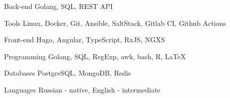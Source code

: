

\begin{cvskills}

  \cvskill
    {Back-end} %
    {Golang, SQL, REST API} %

  \cvskill
    {Tools} %
    {Linux, Docker, Git, Ansible, SaltStack, Gitlab CI, Github Actions} %

  \cvskill
    {Front-end} %
    {Hugo, Angular, TypeScript, RxJS, NGXS} %

  \cvskill
    {Programming} %
    {Golang, SQL, RegExp, awk, bash, R, LaTeX} %

  \cvskill
    {Databases} %
    {PostgreSQL, MongoDB, Redis} %


  \cvskill
    {Languages} %
    {Russian - native, English - intermediate } %

\end{cvskills}
